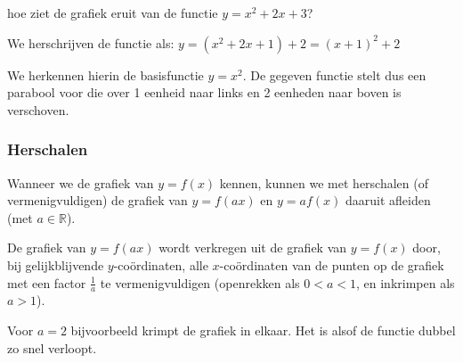 \begin{voorbeeld}
hoe ziet de grafiek eruit van de functie $y=x^{2}+2x+3$?

We herschrijven de functie als: $y=\left(x^{2}+2x+1\right)+2=\left(x+1\right)^{2}+2$

We herkennen hierin de basisfunctie $y=x^{2}$. De gegeven functie
stelt dus een parabool voor die over 1 eenheid naar links en 2 eenheden
naar boven is verschoven.
\end{voorbeeld}


\subsubsection{Herschalen}

Wanneer we de grafiek van $y=f(x)$ kennen, kunnen we met
herschalen (of vermenigvuldigen) de grafiek van $y=f(ax)$ en $y=af(x)$
daaruit afleiden (met $a\in\mathbb{R}$).

De grafiek van $y=f(ax)$ wordt verkregen uit de grafiek
van $y=f(x)$ door, bij gelijkblijvende $y$-co\"ordinaten, alle $x$-co\"ordinaten
van de punten op de grafiek met een factor $\frac{1}{a}$ te vermenigvuldigen
(openrekken als $0<a<1$, en inkrimpen als $a>1$).

Voor $a=2$ bijvoorbeeld krimpt de grafiek in elkaar. Het
is alsof de functie dubbel zo snel verloopt.

\begin{figure}[h]
	
\end{figure}

\begin{figure}[h]
	
\end{figure}





